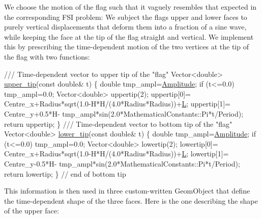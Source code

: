 We choose the motion of the flag such that it vaguely resembles that expected in the corresponding F\+SI problem\+: We subject the flag\textquotesingle{}s upper and lower faces to purely vertical displacements that deform them into a fraction of a sine wave, while keeping the face at the tip of the flag straight and vertical. We implement this by prescribing the time-\/dependent motion of the two vertices at the tip of the flag with two functions\+:


\begin{DoxyCodeInclude}
 

\textcolor{comment}{}
\textcolor{comment}{ /// Time-dependent vector to upper tip of the "flag"}
\textcolor{comment}{} Vector<double> \hyperlink{namespaceFlag__definition_a6af3444eee77be503be4aa8c2ef47c13}{upper\_tip}(\textcolor{keyword}{const} \textcolor{keywordtype}{double}& t)
  \{
   \textcolor{keywordtype}{double} tmp\_ampl=\hyperlink{namespaceFlag__definition_ad0eb269ec983b485aa24a6f2c25d2f5b}{Amplitude};
   \textcolor{keywordflow}{if} (t<=0.0) tmp\_ampl=0.0;
   Vector<double> uppertip(2);
   uppertip[0]= Centre\_x+Radius*sqrt(1.0-H*H/(4.0*Radius*Radius))+\hyperlink{namespaceFlag__definition_a94553533bee82260731a466182369a9d}{L};
   uppertip[1]= Centre\_y+0.5*H-
    tmp\_ampl*sin(2.0*MathematicalConstants::Pi*t/Period);
   \textcolor{keywordflow}{return} uppertip;
  \}  
 \textcolor{comment}{}
\textcolor{comment}{ /// Time-dependent vector to bottom tip of the "flag"}
\textcolor{comment}{} Vector<double> \hyperlink{namespaceFlag__definition_a91eabcfac65c509ab3448d82db1eb988}{lower\_tip}(\textcolor{keyword}{const} \textcolor{keywordtype}{double}& t)
  \{
   \textcolor{keywordtype}{double} tmp\_ampl=\hyperlink{namespaceFlag__definition_ad0eb269ec983b485aa24a6f2c25d2f5b}{Amplitude};
   \textcolor{keywordflow}{if} (t<=0.0) tmp\_ampl=0.0;
   Vector<double> lowertip(2);
   lowertip[0]= Centre\_x+Radius*sqrt(1.0-H*H/(4.0*Radius*Radius))+\hyperlink{namespaceFlag__definition_a94553533bee82260731a466182369a9d}{L};
   lowertip[1]= Centre\_y-0.5*H-
    tmp\_ampl*sin(2.0*MathematicalConstants::Pi*t/Period);
   \textcolor{keywordflow}{return} lowertip;
  \} \textcolor{comment}{// end of bottom tip}

\end{DoxyCodeInclude}


This information is then used in three custom-\/written {\ttfamily Geom\+Object} that define the time-\/dependent shape of the three faces. Here is the one describing the shape of the upper face\+:


